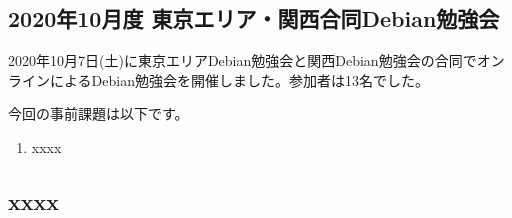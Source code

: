 \documentclass[mingoth,a4paper]{jsarticle}
\begin{document}

\subsection{2020年10月度 東京エリア・関西合同Debian勉強会}

2020年10月7日(土)に東京エリアDebian勉強会と関西Debian勉強会の合同でオンラインによるDebian勉強会を開催しました。参加者は13名でした。



今回の事前課題は以下です。

\begin{enumerate}
 \item xxxx
\end{enumerate}


\begin{multicols}{2}
{\small

}
\end{multicols}

%
%
%
%





\subsection{xxxx}






\end{document}
